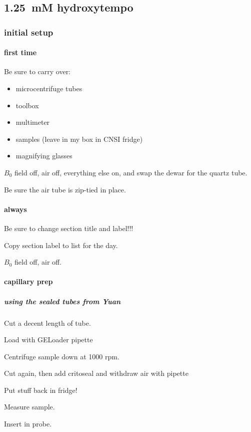 \subsection{1.25~mM hydroxytempo}\label{sec:hydroxytempo_adlinstatistics_1250uM}
\timeblockstart
{}

\subsubsection{initial setup}
\paragraph{first time}
Be sure to carry over:
\begin{itemize}
    \item microcentrifuge tubes
    \item toolbox 
    \item multimeter 
    \item samples (leave in my box in CNSI fridge)
    \item magnifying glasses
\end{itemize}

$B_0$ field off, air off, everything else on, and swap the dewar for the quartz tube.

Be sure the air tube is zip-tied in place.

\paragraph{always}
Be sure to change section title and label!!!

Copy section label to list for the day.

$B_0$ field off, air off.

\paragraph{capillary prep}
\subparagraph{using the sealed tubes from Yuan}

Cut a decent length of tube.

Load with GELoader pipette

Centrifuge sample down at 1000 rpm.

Cut again, then add critoseal and withdraw air with pipette

Put stuff back in fridge!

Measure sample.

Insert in probe.

